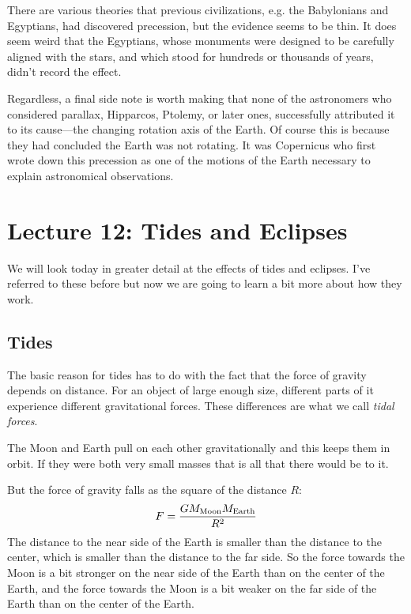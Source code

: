 \documentclass[12pt, preprint]{aastex}
\begin{document}
There are various theories that previous civilizations, e.g. the
Babylonians and Egyptians, had discovered precession, but the evidence
seems to be thin. It does seem weird that the Egyptians, whose
monuments were designed to be carefully aligned with the stars, and
which stood for hundreds or thousands of years, didn't record the
effect.

Regardless, a final side note is worth making that none of the
astronomers who considered parallax, Hipparcos, Ptolemy, or later
ones, successfully attributed it to its cause---the changing rotation
axis of the Earth. Of course this is because they had concluded the
Earth was not rotating. It was Copernicus who first wrote down this
precession as one of the motions of the Earth necessary to explain
astronomical observations.

\clearpage

\section{Lecture 12: Tides and Eclipses}

We will look today in greater detail at the effects of tides and
eclipses. I've referred to these before but now we are going to learn
a bit more about how they work.

\subsection{Tides}

The basic reason for tides has to do with the fact that the force of
gravity depends on distance. For an object of large enough size,
different parts of it experience different gravitational forces. These
differences are what we call {\it tidal forces}.

The Moon and Earth pull on each other gravitationally and this keeps
them in orbit. If they were both very small masses that is all that
there would be to it.

But the force of gravity falls as the square of the distance $R$:
\begin{equation}
F = \frac{GM_{\rm Moon} M_{\rm Earth}}{R^2}
\end{equation}
The distance to the near side of the Earth is smaller than the
distance to the center, which is smaller than the distance to the far
side. So the force towards the Moon is a bit stronger on the near side
of the Earth than  on the center of the Earth, and the force towards
the Moon is a bit weaker on the far side of the Earth than on the
center of the Earth.
\end{document}
